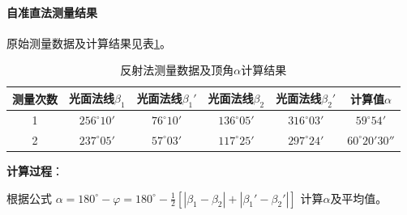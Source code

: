 \documentclass[11pt]{article}
\begin{document}
\paragraph{自准直法测量结果}

原始测量数据及计算结果见表\ref{tab:beta_alpha_data}。

\begin{table}[htbp]
  \centering
  \caption{反射法测量数据及顶角$\alpha$计算结果}
  \vspace{0.5em}
  \label{tab:beta_alpha_data}
  \begin{tabular}{cccccc}
    \toprule
    测量次数 & 光面法线$\beta_1$ & 光面法线$\beta_1'$ & 光面法线$\beta_2$ & 光面法线$\beta_2'$ & 计算值$\alpha$ \\
    \midrule
    1 & $256^\circ10'$ & $76^\circ10'$ & $136^\circ05'$ & $316^\circ03'$ & $59^\circ54'$ \\
    2 & $237^\circ05'$ & $57^\circ03'$ & $117^\circ25'$ & $297^\circ24'$ & $60^\circ20'30''$ \\
    \bottomrule
  \end{tabular}
\end{table}

\textbf{计算过程}：

根据公式 $\alpha = 180^\circ - \varphi = 180^\circ - \frac{1}{2}\left[|\beta_1 - \beta_2| + |\beta_1' - \beta_2'|\right]$ 计算$\alpha$及平均值。
\end{document}
